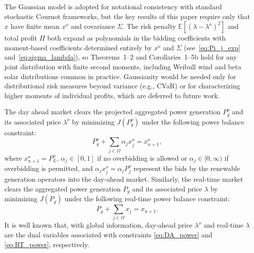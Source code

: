 \documentclass[conference]{IEEEtran}
\begin{document}
The Gaussian model is adopted for notational consistency with standard stochastic Cournot frameworks, but the key results of this paper require only that $x$ have finite mean $x^o$ and covariance $\Sigma$. The risk penalty $\mathbb{E}[(\lambda-\lambda^o)^2]$ and total profit $\Pi$ both expand as polynomials in the bidding coefficients with moment-based coefficients determined entirely by $x^o$ and $\Sigma$ (see~\eqref{eq:Pi_j_exp} and~\eqref{eq:sigma_lambda}), so Theorems~1--2 and Corollaries~1--5b hold for any joint distribution with finite second moments, including Weibull wind and beta solar distributions common in practice. Gaussianity would be needed only for distributional risk measures beyond variance (e.g., CVaR) or for characterizing higher moments of individual profits, which are deferred to future work.

The day ahead market clears the projected aggregated power generation $P_g^o$ and its associated price $\lambda^o$ by minimizing $J(P_g^o)$ under the following power balance constraint:
\begin{equation} 
P_g^o + \sum_{j\in\Omega} \alpha_j x_j^o  = x_{n+1}^o, \label{eq:DA_power}
\end{equation}
where $x_{n+1}^o=P_L^o$, $\alpha_j\in[0,1]$ if no overbidding is allowed or $\alpha_j\in[0,\infty)$ if overbidding is permitted, and $\alpha_j x_j^o =\alpha_j P_j^o$ represent the bids by the renewable generation operators into the day-ahead market. Similarly, the real-time market clears the aggregated power generation $P_g$ and its associated price $\lambda$ by minimizing $J(P_g)$ under the following real-time power balance constraint:
\begin{equation} 
P_g + \sum_{j\in\Omega} x_j   = x_{n+1}. \label{eq:RT_power}
\end{equation}
It is well known that, with global information, day-ahead price $\lambda^o$ and real-time $\lambda$ are the dual variables associated with constraints \eqref{eq:DA_power} and \eqref{eq:RT_power}, respectively. 
\end{document}
